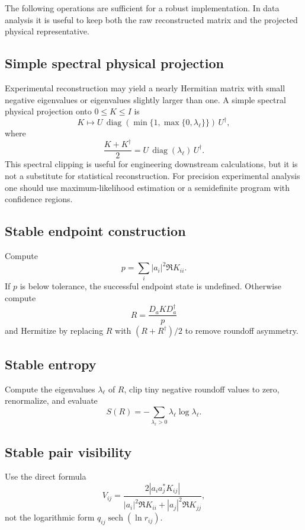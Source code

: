 \documentclass[reprint,aps,pra,superscriptaddress,nofootinbib,longbibliography]{revtex4-2}
\newcommand{\diag}{\operatorname{diag}}
\newcommand{\sech}{\operatorname{sech}}
\begin{document}
The following operations are sufficient for a robust implementation.  In data analysis it is useful to keep both the raw reconstructed matrix and the projected physical representative.

\subsection{Simple spectral physical projection}

Experimental reconstruction may yield a nearly Hermitian matrix with small negative eigenvalues or eigenvalues slightly larger than one.  A simple spectral physical projection onto \(0\le K\le I\) is
\begin{equation}
K\mapsto
U\,\diag(\min\{1,\max\{0,\lambda_\ell\}\})\,U^\dagger,
\label{eq:project-effect}
\end{equation}
where
\[
\frac{K+K^\dagger}{2}=U\,\diag(\lambda_\ell)\,U^\dagger.
\]
This spectral clipping is useful for engineering downstream calculations, but it is not a substitute for statistical reconstruction.  For precision experimental analysis one should use maximum-likelihood estimation or a semidefinite program with confidence regions.

\subsection{Stable endpoint construction}

Compute
\begin{equation}
p=\sum_i |a_i|^2\Re K_{ii}.
\end{equation}
If \(p\) is below tolerance, the successful endpoint state is undefined.  Otherwise compute
\[
R=\frac{D_aKD_a^\dagger}{p}
\]
and Hermitize by replacing \(R\) with \((R+R^\dagger)/2\) to remove roundoff asymmetry.

\subsection{Stable entropy}

Compute the eigenvalues \(\lambda_\ell\) of \(R\), clip tiny negative roundoff values to zero, renormalize, and evaluate
\[
S(R)=-\sum_{\lambda_\ell>0}\lambda_\ell\log\lambda_\ell.
\]

\subsection{Stable pair visibility}

Use the direct formula
\[
V_{ij}
=
\frac{2|a_i a_j^*K_{ij}|}
{|a_i|^2\Re K_{ii}+|a_j|^2\Re K_{jj}},
\]
not the logarithmic form \(q_{ij}\sech(\ln r_{ij})\).
\end{document}
